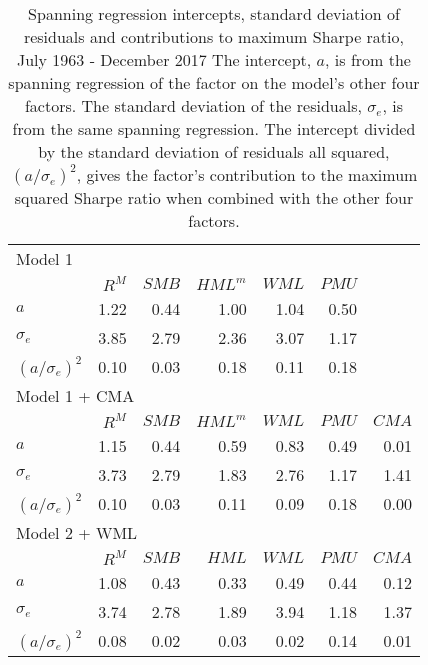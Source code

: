 
\begin{table}[!ht]
\scriptsize
\centering
\caption{
\scriptsize{
Spanning regression intercepts, standard deviation of residuals and contributions to
maximum Sharpe ratio, July 1963 - December 2017 The intercept, $a$, is from the spanning
regression of the factor on the model’s other four factors. The standard deviation of the
residuals, $\sigma_e$, is from the same spanning regression. The intercept divided by the
standard deviation of residuals all squared, $\left( a/\sigma_e\right) ^2$, gives the
factor's contribution to the maximum squared Sharpe ratio when combined with the other
four factors.
}
}
\begin{tabular}{lrrrrrr}
  \toprule
  \multicolumn{7}{l}{Model 1}  \\
                                &  $R^M$ &  $SMB$ &$HML^m$ &  $WML$ &  $PMU$ &   \\
  $a$                           &  1.22  &  0.44  &  1.00  &  1.04  &  0.50  &   \\
  $\sigma_e$                    &  3.85  &  2.79  &  2.36  &  3.07  &  1.17  &   \\
  $\left( a/\sigma_e\right) ^2$ &  0.10  &  0.03  &  0.18  &  0.11  &  0.18  &   \\
[1em]
  \multicolumn{7}{l}{Model 1 + CMA}  \\
                                &  $R^M$ &  $SMB$ &$HML^m$ &  $WML$ &  $PMU$ &  $CMA$ \\
  $a$                           &  1.15  &  0.44  &  0.59  &  0.83  &  0.49  &  0.01  \\
  $\sigma_e$                    &  3.73  &  2.79  &  1.83  &  2.76  &  1.17  &  1.41  \\
  $\left( a/\sigma_e\right) ^2$ &  0.10  &  0.03  &  0.11  &  0.09  &  0.18  &  0.00  \\
[1em]
  \multicolumn{7}{l}{Model 2 + WML}  \\
                                &  $R^M$ &  $SMB$ &  $HML$ &  $WML$ &  $PMU$ &  $CMA$ \\
  $a$                           &  1.08  &  0.43  &  0.33  &  0.49  &  0.44  &  0.12  \\
  $\sigma_e$                    &  3.74  &  2.78  &  1.89  &  3.94  &  1.18  &  1.37  \\
  $\left( a/\sigma_e\right) ^2$ &  0.08  &  0.02  &  0.03  &  0.02  &  0.14  &  0.01  \\
  \bottomrule
\end{tabular}
\label{tbl:contributions}
\end{table}
